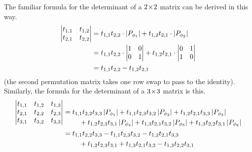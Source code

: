 \begin{example}
The familiar formula for the determinant of a $2 \! \times \! 2$ matrix
can be derived in this way.
\begin{align*}
  \begin{vmatrix}
    t_{1,1}  &t_{1,2} \\
    t_{2,1}  &t_{2,2}
  \end{vmatrix}
  &=
  t_{1,1}t_{2,2}\cdot\deter{P_{\phi_1}}
  +
  t_{1,2}t_{2,1}\cdot\deter{P_{\phi_2}}      \\     
  &=
  t_{1,1}t_{2,2}\cdot\begin{vmatrix}
           1  &0 \\
           0  &1
         \end{vmatrix}
  +
  t_{1,2}t_{2,1}\cdot\begin{vmatrix}
            0  &1 \\
            1  &0
          \end{vmatrix}               \\
  &=t_{1,1}t_{2,2}-t_{1,2}t_{2,1}
\end{align*}
(the second permutation matrix takes one row swap to pass to the 
identity). 
Similarly, the formula for the determinant of a $3 \! \times \! 3$ matrix
is this.
\begin{align*}
  \begin{vmatrix}
    t_{1,1}  &t_{1,2}  &t_{1,3} \\
    t_{2,1}  &t_{2,2}  &t_{2,3} \\
    t_{3,1}  &t_{3,2}  &t_{3,3} 
  \end{vmatrix}
  &=
  \begin{aligned}[t]
    &t_{1,1}t_{2,2}t_{3,3}\deter{P_{\phi_1}}
     +t_{1,1}t_{2,3}t_{3,2}\deter{P_{\phi_2}}
     +t_{1,2}t_{2,1}t_{3,3}\deter{P_{\phi_3}} \\
    &\hbox{}\quad\hbox{}
     +t_{1,2}t_{2,3}t_{3,1}\deter{P_{\phi_4}}
     +t_{1,3}t_{2,1}t_{3,2}\deter{P_{\phi_5}}
     +t_{1,3}t_{2,2}t_{3,1}\deter{P_{\phi_6}}
  \end{aligned}                                      \\
  &=
  \begin{aligned}[t]
    &t_{1,1}t_{2,2}t_{3,3}
     -t_{1,1}t_{2,3}t_{3,2}
     -t_{1,2}t_{2,1}t_{3,3}  \\
    &\hbox{}\quad\hbox{}
     +t_{1,2}t_{2,3}t_{3,1}
     +t_{1,3}t_{2,1}t_{3,2}
     -t_{1,3}t_{2,2}t_{3,1}
  \end{aligned}
\end{align*}
\end{example}

